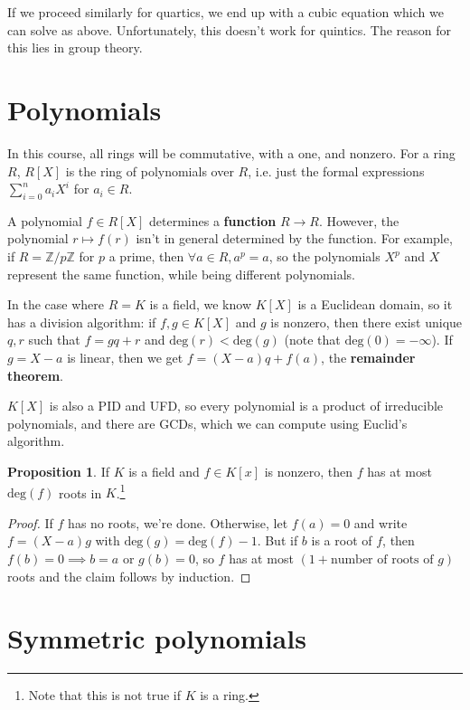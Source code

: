 \documentclass{article}
\theoremstyle{definition}
\newtheorem{prop}[theorem]{Proposition}
\begin{document}
\vspace{1mm}

If we proceed similarly for quartics, we end up with a cubic equation which we can solve as above. Unfortunately, this doesn't work for quintics. The reason for this lies in group theory.

\newpage

\section{Polynomials}

In this course, all rings will be commutative, with a one, and nonzero. For a ring $R$, $R[X]$ is the ring of polynomials over $R$, i.e. just the formal expressions $\sum_{i=0}^{n} a_i X^i$ for $a_i \in R$.

A polynomial $f \in R[X]$ determines a \textbf{function} $R \to R$. However, the polynomial $r \mapsto f(r)$ isn't in general determined by the function. For example, if $R = \mathbb{Z}/p\mathbb{Z}$ for $p$ a prime, then $\forall a \in R, a^p = a$, so the polynomials $X^p$ and $X$ represent the same function, while being different polynomials.

In the case where $R = K$ is a field, we know $K[X]$ is a Euclidean domain, so it has a division algorithm: if $f,g \in K[X]$ and $g$ is nonzero, then there exist unique $q,r$ such that $f = gq + r$ and $\text{deg}(r) < \text{deg}(g)$ (note that $\text{deg}(0) = - \infty$). If $g = X-a$ is linear, then we get $f =(X-a)q + f(a)$, the \textbf{remainder theorem}.

$K[X]$ is also a PID and UFD, so every polynomial is a product of irreducible polynomials, and there are GCDs, which we can compute using Euclid's algorithm.

\begin{prop}
    If $K$ is a field and $f \in K[x]$ is nonzero, then $f$ has at most $\text{deg}(f)$ roots in $K$.\footnote{Note that this is not true if $K$ is a ring.}
\end{prop}
\begin{proof}
    If $f$ has no roots, we're done. Otherwise, let $f(a) = 0$ and write ${f = (X-a)g}$ with $\text{deg}(g) = \text{deg}(f) - 1$. But if $b$ is a root of $f$, then ${f(b) = 0} \implies b=a$ or $g(b)=0$, so $f$ has at most $(1 + \text{number of roots of }g)$ roots and the claim follows by induction.
\end{proof}

\section{Symmetric polynomials}
\end{document}
